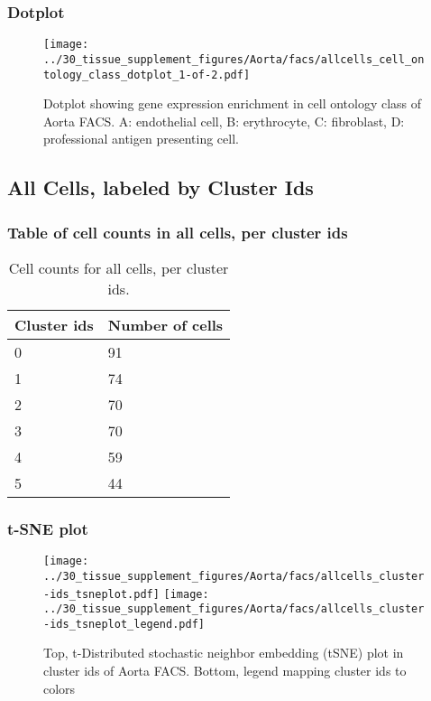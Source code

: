 \newpage
\newpage
\subsubsection{Dotplot}
\begin{figure}[h]
\centering
\texttt{[image: ../30\_tissue\_supplement\_figures/Aorta/facs/allcells\_cell\_ontology\_class\_dotplot\_1-of-2.pdf]}

\caption{ Dotplot  showing gene expression enrichment in cell ontology class of Aorta FACS. A: endothelial cell, B: erythrocyte, C: fibroblast, D: professional antigen presenting cell.}
\end{figure}


\newpage
\subsection{All Cells, labeled by Cluster Ids}
\subsubsection{Table of cell counts in all cells, per cluster ids}\begin{table}[h]
\centering
\label{my-label}
\begin{tabular}{@{}ll@{}}
\toprule

Cluster ids& Number of cells \\ \midrule
0 & 91 \\

1 & 74 \\

2 & 70 \\

3 & 70 \\

4 & 59 \\

5 & 44 \\
\bottomrule
\end{tabular}
\caption{Cell counts for all cells, per cluster ids.}
\end{table}

\newpage
\subsubsection{t-SNE plot}
\begin{figure}[h]
\centering
\texttt{[image: ../30\_tissue\_supplement\_figures/Aorta/facs/allcells\_cluster-ids\_tsneplot.pdf]}
\texttt{[image: ../30\_tissue\_supplement\_figures/Aorta/facs/allcells\_cluster-ids\_tsneplot\_legend.pdf]}
\caption{Top, t-Distributed stochastic neighbor embedding (tSNE) plot  in cluster ids of Aorta FACS. Bottom, legend mapping cluster ids to colors}
\end{figure}


